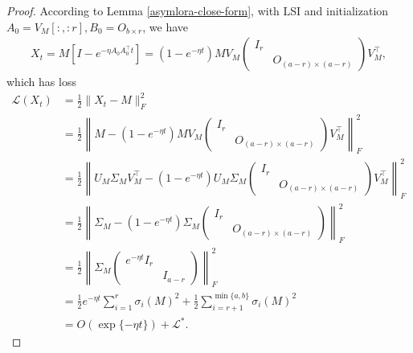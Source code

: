 \begin{proof}
    According to Lemma \ref{asymlora-close-form}, with LSI and initialization $A_0=V_M[:,:r],B_0=O_{b\times r}$, we have 
    \begin{align}
        X_t=M[I-e^{-\eta A_0A_0^\top t}]=(1-e^{-\eta t})MV_M\begin{pmatrix}
            I_r\\&O_{(a-r)\times (a-r)}
        \end{pmatrix}V_M^\top,
    \end{align}
    which has loss
    \begin{align}
        \mathcal{L}(X_t)&=\frac{1}{2}\|X_t-M\|_F^2\\
        &=\frac{1}{2}\left\|M-(1-e^{-\eta t})MV_M\begin{pmatrix}
            I_r\\&O_{(a-r)\times (a-r)}
        \end{pmatrix}V_M^\top\right\|_F^2\\
        &=\frac{1}{2}\left\|U_M\Sigma_MV_M^\top -(1-e^{-\eta t})U_M\Sigma_M\begin{pmatrix}
            I_r\\&O_{(a-r)\times (a-r)}
        \end{pmatrix}V_M^\top \right\|_F^2\\
        &=\frac{1}{2}\left\|\Sigma_M-(1-e^{-\eta t})\Sigma_M\begin{pmatrix}
            I_r\\&O_{(a-r)\times (a-r)}
        \end{pmatrix}\right\|_F^2\\
        &=\frac{1}{2}\left\|\Sigma_M\begin{pmatrix}
            e^{-\eta t}I_r\\&I_{a-r}
        \end{pmatrix}\right\|_F^2\\
        &=\frac{1}{2}e^{-\eta t}\sum_{i=1}^r\sigma_i(M)^2+\frac{1}{2}\sum_{i=r+1}^{\min\{a,b\}}\sigma_i(M)^2\\
        &=O(\exp\{-\eta t\})+\mathcal{L}^*.
    \end{align}
\end{proof}

